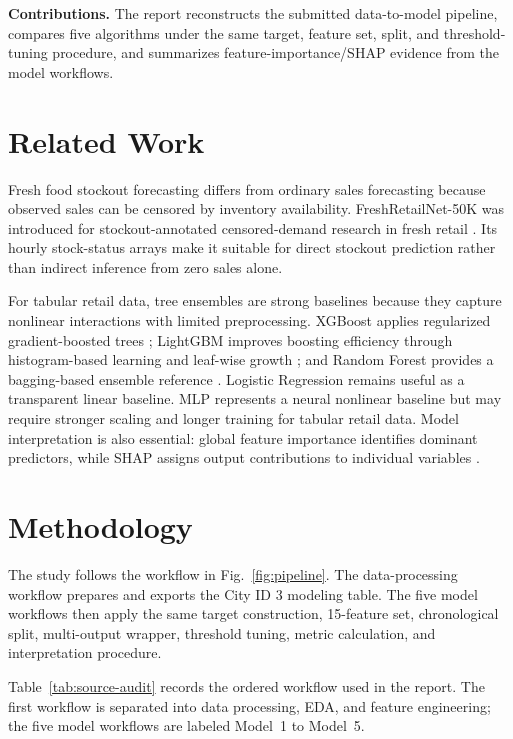 \documentclass{llncs}
\begin{document}
\noindent\textbf{Contributions.} The report reconstructs the submitted data-to-model pipeline, compares five algorithms under the same target, feature set, split, and threshold-tuning procedure, and summarizes feature-importance/SHAP evidence from the model workflows.

\section{Related Work}
Fresh food stockout forecasting differs from ordinary sales forecasting because observed sales can be censored by inventory availability. FreshRetailNet-50K was introduced for stockout-annotated censored-demand research in fresh retail \cite{dingdong}. Its hourly stock-status arrays make it suitable for direct stockout prediction rather than indirect inference from zero sales alone.

For tabular retail data, tree ensembles are strong baselines because they capture nonlinear interactions with limited preprocessing. XGBoost applies regularized gradient-boosted trees \cite{chen}; LightGBM improves boosting efficiency through histogram-based learning and leaf-wise growth \cite{ke}; and Random Forest provides a bagging-based ensemble reference \cite{breiman}. Logistic Regression remains useful as a transparent linear baseline. MLP represents a neural nonlinear baseline but may require stronger scaling and longer training for tabular retail data. Model interpretation is also essential: global feature importance identifies dominant predictors, while SHAP assigns output contributions to individual variables \cite{lundberg}.

\section{Methodology}
The study follows the workflow in Fig.~\ref{fig:pipeline}. The data-processing workflow prepares and exports the City ID 3 modeling table. The five model workflows then apply the same target construction, 15-feature set, chronological split, multi-output wrapper, threshold tuning, metric calculation, and interpretation procedure.

Table~\ref{tab:source-audit} records the ordered workflow used in the report. The first workflow is separated into data processing, EDA, and feature engineering; the five model workflows are labeled Model~1 to Model~5.
\end{document}

